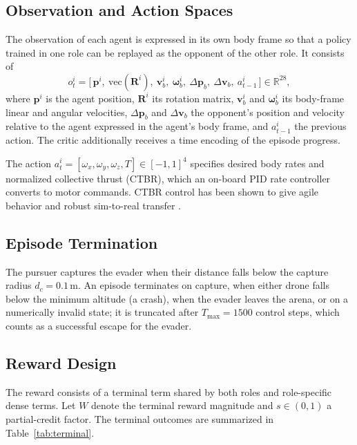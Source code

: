 \subsection{Observation and Action Spaces}
\noindent
The observation of each agent is expressed in its own body frame so that a policy trained in one role can be replayed as the opponent of the other role. It consists of
\begin{equation}
    o^i_t = \big[\, \mathbf{p}^i,\ \mathrm{vec}(\mathbf{R}^i),\ \mathbf{v}^i_b,\ \boldsymbol{\omega}^i_b,\ \Delta\mathbf{p}_b,\ \Delta\mathbf{v}_b,\ a^i_{t-1} \,\big] \in \mathbb{R}^{28},
\end{equation}
where $\mathbf{p}^i$ is the agent position, $\mathbf{R}^i$ its rotation matrix, $\mathbf{v}^i_b$ and $\boldsymbol{\omega}^i_b$ its body-frame linear and angular velocities, $\Delta\mathbf{p}_b$ and $\Delta\mathbf{v}_b$ the opponent's position and velocity relative to the agent expressed in the agent's body frame, and $a^i_{t-1}$ the previous action. The critic additionally receives a time encoding of the episode progress.

The action $a^i_t = [\omega_x, \omega_y, \omega_z, T] \in [-1, 1]^4$ specifies desired body rates and normalized collective thrust (CTBR), which an on-board PID rate controller converts to motor commands. CTBR control has been shown to give agile behavior and robust sim-to-real transfer \cite{kaufmannBenchmarkComparisonLearned2022, chenWhatMattersLearning2025a, tangAgilePEAutonomousUAV2026a}.

\subsection{Episode Termination}
\noindent
The pursuer captures the evader when their distance falls below the capture radius $d_c = 0.1\,\text{m}$. An episode terminates on capture, when either drone falls below the minimum altitude (a crash), when the evader leaves the arena, or on a numerically invalid state; it is truncated after $T_{\max} = 1500$ control steps, which counts as a successful escape for the evader. %

\subsection{Reward Design}
\label{sec:reward}
\noindent
The reward consists of a terminal term shared by both roles and role-specific dense terms. Let $W$ denote the terminal reward magnitude and $s \in (0,1)$ a partial-credit factor. The terminal outcomes are summarized in Table~\ref{tab:terminal}.

